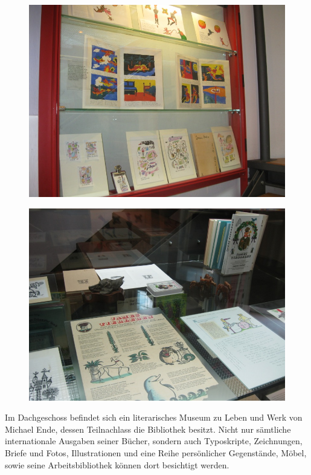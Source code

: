 \documentclass[a4paper,
fontsize=11pt,
oneside,
numbers=noperiodatend,
parskip=half-,
bibliography=totoc,
final
]{scrartcl}
\begin{document}
\begin{figure}[htbp]
\centering
\includegraphics{img/bild23.jpg}
\end{figure}

\begin{figure}[htbp]
\centering
\includegraphics{img/bild24.jpg}
\end{figure}

Im Dachgeschoss befindet sich ein literarisches Museum zu Leben und Werk
von Michael Ende, dessen Teilnachlass die Bibliothek besitzt. Nicht nur
sämtliche internationale Ausgaben seiner Bücher, sondern auch
Typoskripte, Zeichnungen, Briefe und Fotos, Illustrationen und eine
Reihe persönlicher Gegenstände, Möbel, sowie seine Arbeitsbibliothek
können dort besichtigt werden.~
\end{document}
